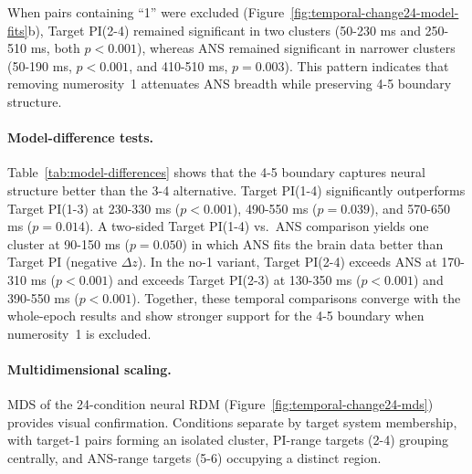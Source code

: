 When pairs containing ``1'' were excluded
(Figure~\ref{fig:temporal-change24-model-fits}b), Target PI(2-4)
remained significant in two clusters (50-230 ms and 250-510 ms, both
$p < 0.001$), whereas ANS remained significant in narrower clusters
(50-190 ms, $p < 0.001$, and 410-510 ms, $p = 0.003$). This pattern
indicates that removing numerosity~1 attenuates ANS breadth while
preserving 4-5 boundary structure.

\paragraph{Model-difference tests.}
Table~\ref{tab:model-differences}
shows that the 4-5 boundary captures neural structure better than the
3-4 alternative. Target PI(1-4) significantly outperforms Target PI(1-3)
at 230-330 ms ($p < 0.001$), 490-550 ms ($p = 0.039$), and 570-650 ms
($p = 0.014$). A two-sided Target PI(1-4) vs.\ ANS comparison yields one cluster
at 90-150 ms ($p = 0.050$) in which ANS fits the brain data better
than Target PI (negative $\Delta z$). In the no-1 variant, Target PI(2-4)
exceeds ANS at 170-310 ms ($p < 0.001$) and exceeds Target PI(2-3) at
130-350 ms ($p < 0.001$) and 390-550 ms ($p < 0.001$). Together,
these temporal comparisons converge with the whole-epoch results and
show stronger support for the 4-5 boundary when numerosity~1 is
excluded.



\paragraph{Multidimensional scaling.} MDS of the 24-condition neural
RDM (Figure~\ref{fig:temporal-change24-mds}) provides visual
confirmation. Conditions separate by target system membership, with target-1
pairs forming an isolated cluster, PI-range targets (2-4) grouping
centrally, and ANS-range targets (5-6) occupying a distinct region.


